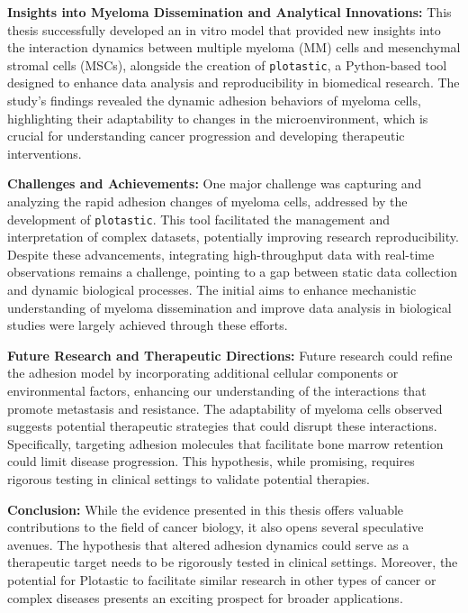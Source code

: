 

%
\label{sec:discussion_overall_conclusion}%
%
\textbf{Insights into Myeloma Dissemination and Analytical Innovations:}
This thesis successfully developed an in vitro model that provided new insights
into the interaction dynamics between multiple myeloma (MM) cells and
mesenchymal stromal cells (MSCs), alongside the creation of \texttt{plotastic},
a Python-based tool designed to enhance data analysis and reproducibility in
biomedical research. The study's findings revealed the dynamic adhesion
behaviors of myeloma cells, highlighting their adaptability to changes in the
microenvironment, which is crucial for understanding cancer progression and
developing therapeutic interventions.

\textbf{Challenges and Achievements:}
One major challenge was capturing and analyzing the rapid adhesion changes of
myeloma cells, addressed by the development of \texttt{plotastic}. This tool
facilitated the management and interpretation of complex datasets, potentially
improving research reproducibility. Despite these advancements, integrating
high-throughput data with real-time observations remains a challenge, pointing
to a gap between static data collection and dynamic biological processes. The
initial aims to enhance mechanistic understanding of myeloma dissemination and
improve data analysis in biological studies were largely achieved through these
efforts.

\textbf{Future Research and Therapeutic Directions:}
Future research could refine the adhesion model by incorporating additional
cellular components or environmental factors, enhancing our understanding of the
interactions that promote metastasis and resistance. The adaptability of myeloma
cells observed suggests potential therapeutic strategies that could disrupt
these interactions. Specifically, targeting adhesion molecules that facilitate
bone marrow retention could limit disease progression. This hypothesis,
while promising, requires rigorous testing in clinical settings to validate
potential therapies.

\textbf{Conclusion:}
While the evidence presented in this thesis offers valuable contributions to the
field of cancer biology, it also opens several speculative avenues. The
hypothesis that altered adhesion dynamics could serve as a therapeutic target
needs to be rigorously tested in clinical settings. Moreover, the potential for
Plotastic to facilitate similar research in other types of cancer or complex
diseases presents an exciting prospect for broader applications.

